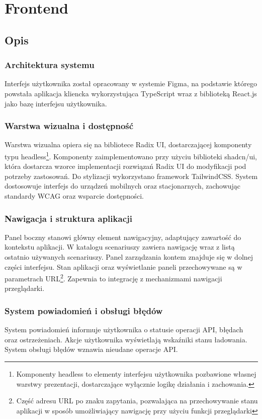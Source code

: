 \section{Frontend}
\subsection{Opis}
\subsubsection{Architektura systemu}
Interfejs użytkownika został opracowany w systemie Figma, na podstawie którego powstała aplikacja kliencka wykorzystująca TypeScript wraz z biblioteką React.js jako bazę interfejsu użytkownika.
\subsubsection{Warstwa wizualna i dostępność}
Warstwa wizualna opiera się na bibliotece Radix UI, dostarczającej komponenty typu headless\footnote{Komponenty headless to elementy interfejsu użytkownika pozbawione własnej warstwy prezentacji, dostarczające wyłącznie logikę działania i zachowania.}. Komponenty zaimplementowano przy użyciu biblioteki shadcn/ui, która dostarcza wzorce implementacji rozwiązań Radix UI do modyfikacji pod potrzeby zastosowań. Do stylizacji wykorzystano framework TailwindCSS. System dostosowuje interfejs do urządzeń mobilnych oraz stacjonarnych, zachowując standardy WCAG oraz wsparcie dostępności.

\subsubsection{Nawigacja i struktura aplikacji}
Panel boczny stanowi główny element nawigacyjny, adaptujący zawartość do kontekstu aplikacji. W katalogu scenariuszy zawiera nawigację wraz z listą ostatnio używanych scenariuszy. Panel zarządzania kontem znajduje się w dolnej części interfejsu.
Stan aplikacji oraz wyświetlanie paneli przechowywane są w parametrach URL\footnote{Część adresu URL po znaku zapytania, pozwalająca na przechowywanie stanu aplikacji w sposób umożliwiający nawigację przy użyciu funkcji przeglądarki}. Zapewnia to integrację z mechanizmami nawigacji przeglądarki.
\subsubsection{System powiadomień i obsługi błędów}
System powiadomień informuje użytkownika o statusie operacji API, błędach oraz ostrzeżeniach. Akcje użytkownika wyświetlają wskaźniki stanu ładowania. System obsługi błędów wznawia nieudane operacje API.

